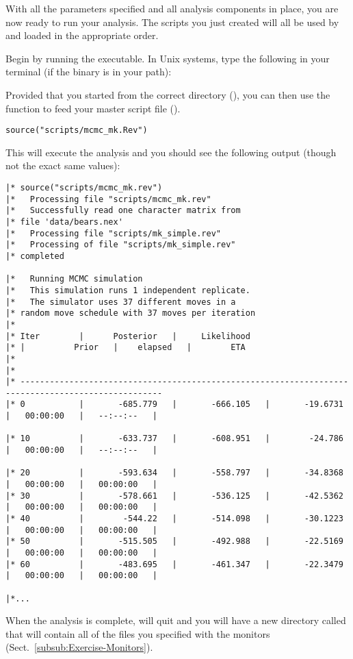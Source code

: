 With all the parameters specified and all analysis components in place, you are now ready to run your analysis. 
The \Rev scripts you just created will all be used by \RevBayes and loaded in the appropriate order.

{\begin{framed}
Begin by running the \RevBayes executable. In Unix systems, type the following in your terminal (if the \RevBayes binary is in your path):

\colorbox{black}{\strut\hspace{1mm}\textcolor[rgb]{0,1,1}{}\hspace{0.925\textwidth}}
\end{framed}}

Provided that you started \RevBayes from the correct directory (), you can then use the  function to feed \RevBayes your master script file ().
{\tt \begin{snugshade*}
\begin{lstlisting}
source("scripts/mcmc_mk.Rev")
\end{lstlisting}
\end{snugshade*}}

This will execute the analysis and you should see the following output (though not the exact same values):


{\tiny{\tt \begin{snugshade*}
\begin{lstlisting}
|* source("scripts/mcmc_mk.rev")
|*   Processing file "scripts/mcmc_mk.rev"
|*   Successfully read one character matrix from
|* file 'data/bears.nex'
|*   Processing file "scripts/mk_simple.rev"
|*   Processing of file "scripts/mk_simple.rev"
|* completed

|*   Running MCMC simulation
|*   This simulation runs 1 independent replicate.
|*   The simulator uses 37 different moves in a
|* random move schedule with 37 moves per iteration
|*
|* Iter        |      Posterior   |     Likelihood  
|* |          Prior   |    elapsed   |        ETA   
|*
|*
|* ---------------------------------------------------------------------------------------------------
|* 0           |       -685.779   |       -666.105   |       -19.6731   |   00:00:00   |   --:--:--   |

|* 10          |       -633.737   |       -608.951   |        -24.786   |   00:00:00   |   --:--:--   |

|* 20          |       -593.634   |       -558.797   |       -34.8368   |   00:00:00   |   00:00:00   |
|* 30          |       -578.661   |       -536.125   |       -42.5362   |   00:00:00   |   00:00:00   |
|* 40          |        -544.22   |       -514.098   |       -30.1223   |   00:00:00   |   00:00:00   |
|* 50          |       -515.505   |       -492.988   |       -22.5169   |   00:00:00   |   00:00:00   |
|* 60          |       -483.695   |       -461.347   |       -22.3479   |   00:00:00   |   00:00:00   |

|*...
\end{lstlisting}
\end{snugshade*}}}

When the analysis is complete, \RevBayes will quit and you will have a new directory called  that will contain all of the files you specified with the monitors (Sect.\ \ref{subsub:Exercise-Monitors}).



\newpage
